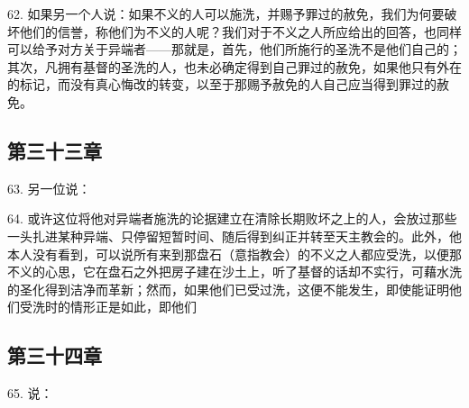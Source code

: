 62. 如果另一个人说：如果不义的人可以施洗，并赐予罪过的赦免，我们为何要破坏他们的信誉，称他们为不义的人呢？我们对于不义之人所应给出的回答，也同样可以给予对方关于异端者——那就是，首先，他们所施行的圣洗不是他们自己的；其次，凡拥有基督的圣洗的人，也未必确定得到自己罪过的赦免，如果他只有外在的标记，而没有真心悔改的转变，以至于那赐予赦免的人自己应当得到罪过的赦免。\par


\subsection{第三十三章}

63. 另一位说：\par

64. 或许这位将他对异端者施洗的论据建立在清除长期败坏之上的人，会放过那些一头扎进某种异端、只停留短暂时间、随后得到纠正并转至天主教会的。此外，他本人没有看到，可以说所有来到那盘石（意指教会）的不义之人都应受洗，以便那不义的心思，它在盘石之外把房子建在沙土上，听了基督的话却不实行，可藉水洗的圣化得到洁净而革新；然而，如果他们已受过洗，这便不能发生，即使能证明他们受洗时的情形正是如此，即他们\par


\subsection{第三十四章}

65. 说：\par

